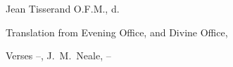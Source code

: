 \endlyrics

\bigskip

\source Jean Tisserand O.F.M., d. 

\source Translation from Evening Office, {} \smallrm and Divine Office, 

\source Verses {}--{}, J.~M.~Neale,  {}--


%

